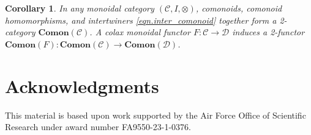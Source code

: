 \documentclass[11pt, one side, article]{memoir}
\theoremstyle{definition}
\theoremstyle{plain}
\newtheorem{corollary}[definitionx]{Corollary}
\newcommand{\cat}[1]{\mathcal{#1}}%
\newcommand{\Cat}[1]{\mathbf{#1}}%
\newcommand{\0}{\textsf{0}}
\newcommand{\1}{\tn{\textsf{1}}}
\begin{document}
\begin{corollary}\label{cor.main}
In any monoidal category $(\cat{C},I,\otimes)$, comonoids, comonoid homomorphisms, and intertwiners \eqref{eqn.inter_comonoid} together form a 2-category $\Cat{Comon}(\cat{C})$. A colax monoidal functor $F\colon\cat{C}\to\cat{D}$ induces a 2-functor $\Cat{Comon}(F)\colon\Cat{Comon}(\cat{C})\to\Cat{Comon}(\cat{D})$.
\end{corollary}


\section*{Acknowledgments}
This material is based upon work supported by the Air Force Office of Scientific Research under award number FA9550-23-1-0376.

\printbibliography 
\end{document}
